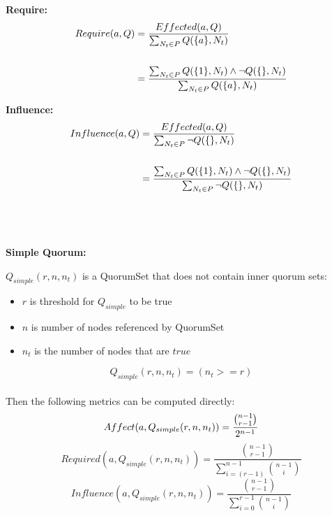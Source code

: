 \textbf{Require:}
\begin{align}
\begin{split}
    Require(a,Q) &= \frac{Effected(a,Q)}{\sum_{N_t \in P} Q(\{a\},N_t){}} \\
\\
                 &= \frac{\sum_{N_t \in P} Q(\{1\},N_t) \land \lnot Q(\{\},N_t){}}{\sum_{N_t \in P} Q(\{a\},N_t){}}
\end{split}
\end{align}

\textbf{Influence:}
\begin{align}
\begin{split}
    Influence(a,Q) &= \frac{Effected(a,Q)}{\sum_{N_t \in P} \lnot Q(\{\},N_t){}} \\
\\
                   &= \frac{\sum_{N_t \in P} Q(\{1\},N_t) \land \lnot Q(\{\},N_t){}}{\sum_{N_t \in P} \lnot Q(\{\},N_t){}}
\end{split}
\end{align}
\\



\newcommand{\effectedCombinationsExpression}[0]{ \binom{n-1}{r-1} }

\leavevmode
\\
\par
\textbf{Simple Quorum:}\\\par
$Q_{simple}(r,n,n_t)$ is a QuorumSet that does not contain inner quorum sets:
\begin{itemize}
  \item $r$ is threshold for $Q_{simple}$ to be true
  \item $n$ is number of nodes referenced by QuorumSet
  \item $n_t$ is the number of nodes that are $true$
\end{itemize}
\begin{equation}
    Q_{simple}(r,n,n_t) = (n_t>=r)
\end{equation}
\\

Then the following metrics can be computed directly:
\begin{equation}
	Affect(a,Q_{simple}(r,n,n_t)) = \frac{ \effectedCombinationsExpression{} }{ \affectDenomExpression{} }
\end{equation}
\begin{equation}
	Required(a,Q_{simple}(r,n,n_t)) = \frac{ \effectedCombinationsExpression{} }{ \sum_{i=(r-1)}^{n-1} \binom{n-1}{i} }
\end{equation}
\begin{equation}
	Influence(a,Q_{simple}(r,n,n_t)) = \frac{ \effectedCombinationsExpression{} }{ \sum_{i=0}^{r-1} \binom{n-1}{i} }
\end{equation}
